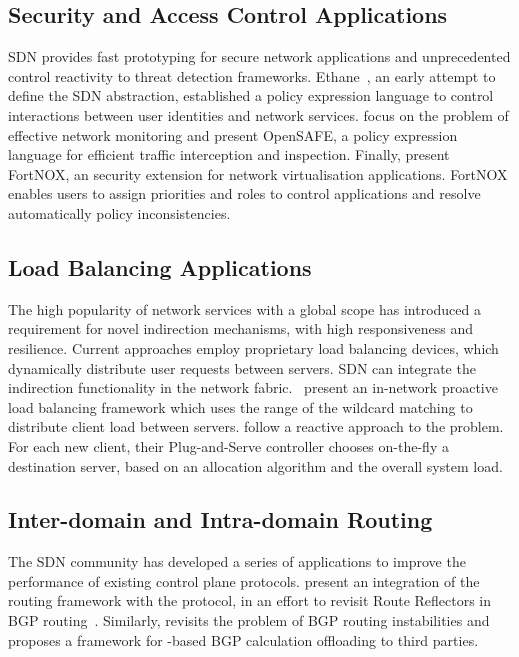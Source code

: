 \subsection{Security and Access Control Applications}

SDN provides fast  prototyping for secure network applications and
unprecedented control reactivity to threat detection frameworks.
Ethane~, an  early attempt to define the SDN
abstraction, established a policy expression language to control interactions
between user identities and network services.   focus on the
problem of effective network monitoring and present OpenSAFE, a policy
expression language for efficient traffic interception and inspection.  Finally,
 present FortNOX, an security extension  for network
virtualisation applications. FortNOX enables users to assign priorities and
roles to control applications and resolve automatically policy inconsistencies. 
 
\subsection{Load Balancing Applications}

The high popularity of network services with a global scope has introduced a
requirement for novel indirection mechanisms, with high responsiveness and
resilience. Current approaches employ proprietary load balancing devices, which
dynamically distribute user requests between servers.  SDN can integrate the
indirection functionality in the network fabric. ~present an
in-network proactive load balancing framework which uses the range of the \of
wildcard matching to distribute client load between servers.
 follow a reactive approach to the problem. For
each new client, their Plug-and-Serve controller chooses on-the-fly a
destination server, based on an allocation algorithm and the overall system
load.

\subsection{Inter-domain and Intra-domain Routing}

The SDN community has developed a series of applications to improve the
performance of existing control plane protocols.   present
an integration of the 
 routing framework with the \of protocol, in an effort to
revisit Route Reflectors in BGP routing~. Similarly,
 revisits the problem of BGP routing instabilities and
proposes a framework for \of-based BGP calculation offloading to third parties.

